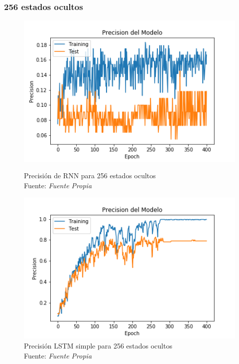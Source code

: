 \subsubsection{256 estados ocultos}\label{256stateprec}
\begin{figure}[H]
	\centering
	\includegraphics[width=0.7\linewidth]{Figures/rnn_256_prec}
	\caption{Precisión de RNN para 256 estados ocultos\\ Fuente: {\textit{Fuente Propia}}}
	\label{fig:rnn256prec}
	\centering
	\includegraphics[width=0.7\linewidth]{Figures/lstm_256_prec13}
	\caption{Precisión LSTM simple para 256 estados ocultos\\ Fuente: {\textit{Fuente Propia}}}
	\label{fig:lstm256prec13}
\end{figure}
